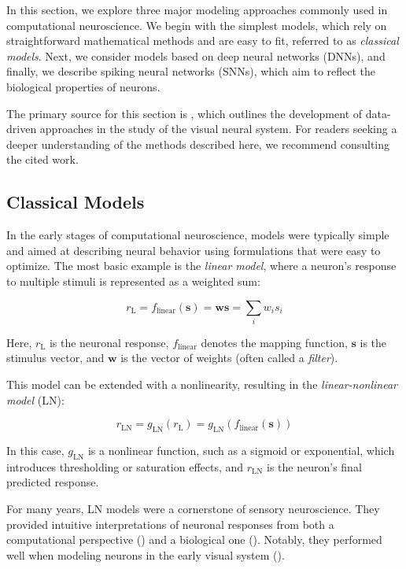 In this section, we explore three major modeling approaches commonly used in computational neuroscience. We begin with the simplest models, which rely on straightforward mathematical methods and are easy to fit, referred to as \emph{classical models}. Next, we consider models based on deep neural networks (DNNs), and finally, we describe spiking neural networks (SNNs), which aim to reflect the biological properties of neurons.

The primary source for this section is \citet{annurev:/content/journals/10.1146/annurev-vision-091718-014731}, which outlines the development of data-driven approaches in the study of the visual neural system. For readers seeking a deeper understanding of the methods described here, we recommend consulting the cited work.

\subsection{Classical Models}
\label{subsec:classical_approach}

In the early stages of computational neuroscience, models were typically simple and aimed at describing neural behavior using formulations that were easy to optimize. The most basic example is the \emph{linear model}, where a neuron's response to multiple stimuli is represented as a weighted sum:

$$r_{\text{L}} = f_{\text{linear}}(\boldsymbol{s}) = \boldsymbol{w}\boldsymbol{s} = \sum_{i} w_i s_i$$

Here, $r_{\text{L}}$ is the neuronal response, $f_{\text{linear}}$ denotes the mapping function, $\boldsymbol{s}$ is the stimulus vector, and $\boldsymbol{w}$ is the vector of weights (often called a \emph{filter}).

This model can be extended with a nonlinearity, resulting in the \emph{linear-nonlinear model} (LN):

$$r_{\text{LN}} = g_{\text{LN}}(r_{\text{L}}) = g_{\text{LN}}(f_{\text{linear}}(\boldsymbol{s}))$$

In this case, $g_{\text{LN}}$ is a nonlinear function, such as a sigmoid or exponential, which introduces thresholding or saturation effects, and $r_{\text{LN}}$ is the neuron's final predicted response.

For many years, LN models were a cornerstone of sensory neuroscience. They provided intuitive interpretations of neuronal responses from both a computational perspective (\citet{hubel1965receptive, movshon1978receptive}) and a biological one (\citet{mohanty2012membrane, SHAPLEY2009907, poirazi2003pyramidal}). Notably, they performed well when modeling neurons in the early visual system (\citet{SHAPLEY2009907, baccus2002fast, Carandini10577}).

